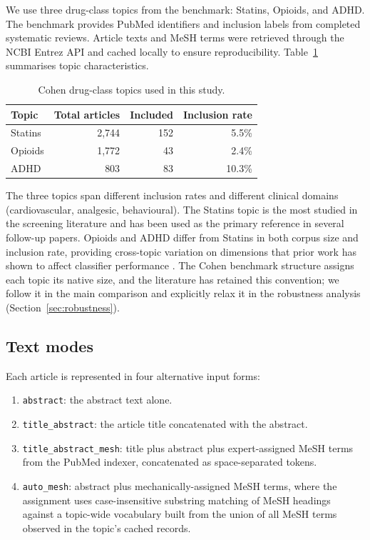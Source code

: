 \documentclass{article}
\begin{document}
We use three drug-class topics from the  benchmark: Statins, Opioids, and ADHD. The benchmark provides PubMed identifiers and inclusion labels from completed systematic reviews. Article texts and MeSH terms were retrieved through the NCBI Entrez API and cached locally to ensure reproducibility. Table~\ref{tab:topics} summarises topic characteristics.

\begin{table}[h]
\centering
\small
\begin{tabular}{lrrr}
\toprule
Topic & Total articles & Included & Inclusion rate \\
\midrule
Statins & 2,744 & 152 & 5.5\% \\
Opioids & 1,772 & 43 & 2.4\% \\
ADHD & 803 & 83 & 10.3\% \\
\bottomrule
\end{tabular}
\caption{Cohen drug-class topics used in this study.}
\label{tab:topics}
\end{table}

The three topics span different inclusion rates and different clinical domains (cardiovascular, analgesic, behavioural). The Statins topic is the most studied in the screening literature and has been used as the primary reference in several follow-up papers. Opioids and ADHD differ from Statins in both corpus size and inclusion rate, providing cross-topic variation on dimensions that prior work has shown to affect classifier performance \cite{cohen2008,matwin2010}. The Cohen benchmark structure assigns each topic its native size, and the literature has retained this convention; we follow it in the main comparison and explicitly relax it in the robustness analysis (Section~\ref{sec:robustness}).

\subsection{Text modes}

Each article is represented in four alternative input forms:

\begin{enumerate}
\item \texttt{abstract}: the abstract text alone.
\item \texttt{title\_abstract}: the article title concatenated with the abstract.
\item \texttt{title\_abstract\_mesh}: title plus abstract plus expert-assigned MeSH terms from the PubMed indexer, concatenated as space-separated tokens.
\item \texttt{auto\_mesh}: abstract plus mechanically-assigned MeSH terms, where the assignment uses case-insensitive substring matching of MeSH headings against a topic-wide vocabulary built from the union of all MeSH terms observed in the topic's cached records.
\end{enumerate}
\end{document}

